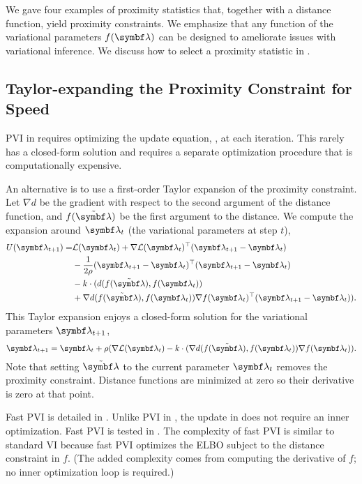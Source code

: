 We gave four examples of proximity statistics that, together with a distance function, yield proximity constraints. We emphasize that any function of the variational parameters $f(\mblambda)$ can be designed to ameliorate issues with variational inference. We discuss how to select a proximity statistic in .

\subsection{Taylor-expanding the Proximity Constraint for Speed}
\label{sec:proximity_taylor}
\gls{PVI} in  requires optimizing the update equation, , at each iteration. This rarely has a closed-form solution and requires a separate optimization procedure that is computationally expensive.

An alternative is to use a first-order Taylor expansion of the proximity constraint. Let $\nabla d$ be the gradient with respect to the second argument of the distance function, and $f(\tmblambda)$ be the first argument to the distance. We compute the expansion around $\mblambda_t$ (the variational parameters at step $t$),
\begin{align*}
  U(\mblambda_{t+1}) = &\cL(\mblambda_t) + \nabla \cL(\mblambda_t)^\top(\mblambda_{t+1}-\mblambda_t) \\
                       &- \frac{1}{2\rho} (\mblambda_{t+1}-\mblambda_t)^\top (\mblambda_{t+1}-\mblambda_t)\\
                       & - k \cdot (d(f(\tmblambda), f(\mblambda_{t}))  \\
                       &+ \nabla d (f(\tmblambda), f(\mblambda_t)) \nabla f(\mblambda_t)^\top (\mblambda_{t+1}-\mblambda_t)).
\end{align*}
This Taylor expansion enjoys a closed-form solution for the variational parameters $\mblambda_{t+1}$,
\begin{align}
  \mblambda_{t+1} = \mblambda_t + \rho(\nabla \cL(\mblambda_t) - k \cdot (\nabla d (f(\tmblambda), f(\mblambda_t)) \nabla f(\mblambda_t)).
  \label{eq:fast-update}
\end{align}
Note that setting $\tmblambda$ to the current parameter $\mblambda_t$ removes the proximity constraint. Distance functions are minimized at zero so their derivative is zero at that point.

Fast \gls{PVI} is detailed in . Unlike \gls{PVI} in , the update in  does not require an inner optimization. Fast \gls{PVI} is tested in . The complexity of fast \gls{PVI} is similar to standard \gls{VI} because fast \gls{PVI} optimizes the \gls{ELBO} subject to the distance constraint in $f$. (The added complexity comes from computing the derivative of $f$; no inner optimization loop is required.)

